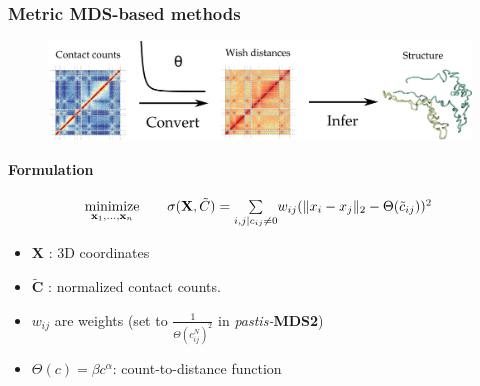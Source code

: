 \documentclass[xcolor=dvipsnames]{beamer}
\begin{document}

\begin{frame}
\frametitle{Metric MDS-based methods}

\begin{figure}
\begin{center}
\includegraphics[width=0.9\linewidth]{figures/mds_idea.png}
\end{center}
\end{figure}
\vspace{1em}

\textbf{\color{Blue} Formulation}
\begin{equation*}
\renewcommand{\arraystretch}{2}
\begin{array}{ccll}
\underset{{\bf x}_1,\ldots,{\bf x}_n}{\text{minimize}} & &
\sigma(\mathbf{X},  \tilde{C}) = \underset{i, j | c_{ij} \neq 0}{\sum} w_{ij}(\|x_i - x_j\|_2 -
\Theta(\tilde{c}_{ij}))^2\,
\\
\end{array}
\end{equation*}
\vspace{2em}

{\tiny
\begin{multicols}{2}
\begin{itemize}[label={$\bullet$}]
\item $\mathbf{X}$ : 3D coordinates
\item $\mathbf{\tilde{C}}$ : normalized contact counts.
\item $w_{ij}$ are weights (set to $\frac{1}{\Theta(c^N_{ij})^2}$ in
\textit{pastis-}\textbf{MDS2}) 
\item $\Theta(c) = \beta c^\alpha$: count-to-distance function
\end{itemize}
\end{multicols}
}
\end{frame}
\end{document}
